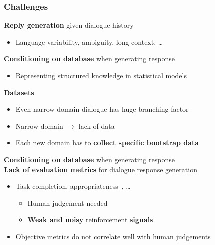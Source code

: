 \documentclass[10pt, compress,british,xcolor={svgnames,dvipsnames,x11names},trans]{beamer}
\begin{document}
\begin{frame}\frametitle{Challenges}
            {\bf \color{blue} Reply generation} given dialogue history
            \\
            \begin{itemize}
                \item Language variability, ambiguity, long context, \dots
            \end{itemize}
            {\bf \color{blue} Conditioning on database} when generating response 
            \\
            \begin{itemize}
                \item Representing structured knowledge in statistical models
            \end{itemize}
            {\bf \color{blue} Datasets}
            \\
            \begin{itemize}
                \item Even narrow-domain  dialogue has huge branching factor
                \item Narrow domain $\longrightarrow$ lack of data
                \item Each new domain has to {\bf collect specific bootstrap data}
            \end{itemize}
            {\bf \color{blue} Conditioning on database} when generating response  \\
            {\bf \color{blue} Lack of evaluation metrics} for dialogue response generation \\
            \begin{itemize}
                \item Task completion, appropriateness~\cite{bohus2007error}, \dots 
                \begin{itemize}
                    \item Human judgement needed \item {\bf Weak and noisy} reinforcement {\bf signals}
                \end{itemize}
                \item Objective metrics do not correlate well with human judgements
            \end{itemize}
\end{frame}
\end{document}
